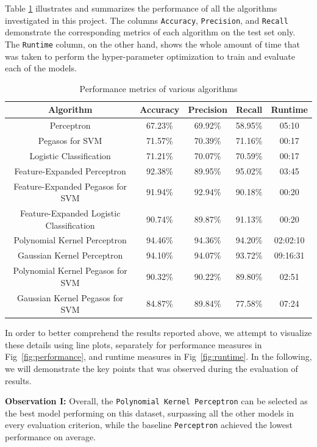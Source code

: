
Table \ref{tab:performance_metrics} illustrates and summarizes the performance of all the algorithms investigated in this project. The columns \texttt{Accuracy}, \texttt{Precision}, and \texttt{Recall} demonstrate the corresponding metrics of each algorithm on the test set only. The \texttt{Runtime} column, on the other hand, shows the whole amount of time that was taken to perform the hyper-parameter optimization to train and evaluate each of the models.

\begin{table}[h!]
    \centering
    \begin{tabular}{|c|c|c|c|c|}
    \hline
    \textbf{Algorithm} & \textbf{Accuracy} & \textbf{Precision} & \textbf{Recall} & \textbf{Runtime} \\ \hline
    Perceptron & 67.23\% & 69.92\% & 58.95\% & 05:10 \\
    Pegasos for SVM & 71.57\% & 70.39\% & 71.16\% & 00:17 \\ 
    Logistic Classification & 71.21\% & 70.07\% & 70.59\% & 00:17 \\ \hline
    Feature-Expanded Perceptron & 92.38\% & 89.95\% & 95.02\% & 03:45 \\ 
    Feature-Expanded Pegasos for SVM & 91.94\% & 92.94\% & 90.18\% & 00:20 \\ 
    Feature-Expanded Logistic Classification & 90.74\% & 89.87\% & 91.13\% & 00:20 \\ \hline
    Polynomial Kernel Perceptron & 94.46\% & 94.36\% & 94.20\% & 02:02:10 \\ 
    Gaussian Kernel Perceptron & 94.10\% & 94.07\% & 93.72\% & 09:16:31 \\ 
    Polynomial Kernel Pegasos for SVM & 90.32\% & 90.22\% & 89.80\% & 02:51 \\ 
    Gaussian Kernel Pegasos for SVM & 84.87\% & 89.84\% & 77.58\% & 07:24 \\ \hline
    \end{tabular}
    \caption{Performance metrics of various algorithms}
    \label{tab:performance_metrics}
\end{table}

In order to better comprehend the results reported above, we attempt to visualize these details using line plots, separately for performance measures in Fig~\ref{fig:performance}, and runtime measures in Fig~\ref{fig:runtime}. In the following, we will demonstrate the key points that was observed during the evaluation of results.

{\bf Observation I:} Overall, the \texttt{Polynomial Kernel Perceptron} can be selected as the best model performing on this dataset, surpassing all the other models in every evaluation criterion, while the baseline \texttt{Perceptron} achieved the lowest performance on average.


